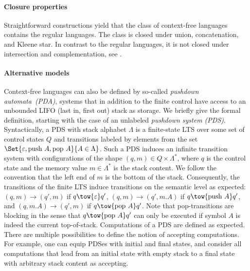 \documentclass[../../diss.tex]{subfiles}
\begin{document}

\paragraph{Closure properties}

Straightforward constructions yield that the class of context-free languages contains the regular languages.
The class is closed under union, concatenation, and Kleene star.
In contrast to the regular languages, it is not closed under intersection and complementation, see \eg \cite{Kozen97}.

\paragraph{Alternative models}

Context-free languages can also be defined by so-called \emph{pushdown automata~(PDA)}, systems that in addition to the finite control have access to an unbounded LIFO (last in, first out) stack as storage.
We briefly give the formal definition, starting with the case of an unlabeled \emph{pushdown system (PDS)}.
Syntactically, a PDS with stack alphabet $\Lambda$ is a finite-state LTS over some set of control states $Q$ and transitions labeled by elements from the set $\Set{ \eps, \pushop A, \popop A}{A \in \Lambda}$.
Such a PDS induces an infinite transition system with configurations of the shape $(q,m) \in Q \times \Lambda^*$, where $q$ is the control state and the memory value $m \in \Lambda^*$ is the stack content.
We follow the convention that the left end of $m$ is the bottom of the stack.
Consequently, the transitions of the finite LTS induce transitions on the semantic level as expected: $(q,m) \to (q',m)$ if $q \tow{\eps} q'$, $(q,m) \to (q',m.A)$ if $q \tow{\pushop A} q'$, and $(q,m.A) \to (q',m)$ if $q \tow{\popop A} q'$.
Note that pop-transitions are blocking in the sense that $q \tow{\popop A} q'$ can only be executed if symbol $A$ is indeed the current top-of-stack.
Computations of a PDS are defined as expected.
There are multiple possibilities to define the notion of accepting computations.
For example, one can equip PDSes with initial and final states, and consider all computations that lead from an initial state with empty stack to a final state with arbitrary stack content as accepting.
\end{document}
